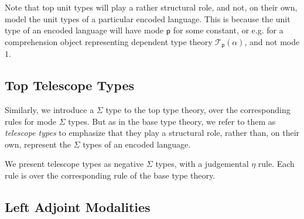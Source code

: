 \documentclass[10pt]{article}
\theoremstyle{definition}
\newcommand\dsd[1]{\ensuremath{\mathsf{#1}}}
\newcommand{\yields}{\vdash}
\newcommand{\TYPE}{\,\,\mathsf{Type}}
\newcommand{\ISFIB}{\,\,\mathsf{IsFib}}
\newcommand{\app}[2]{\ensuremath{#1 \: #2}}
\newcommand{\telety}[3]{\ensuremath{(#1{:}#2,#3)}}
\newcommand{\sigmacl}[3]{\ensuremath{(#1{:}#2,#3)}}
\newcommand{\fst}[1]{\app{\dsd{fst}}{#1}}
\newcommand{\snd}[1]{\app{\dsd{snd}}{#1}}
\newcommand\El[2]{\mathcal{T}_{#1}(#2)}
\begin{document}
Note that top unit types will play a rather structural role, and not, on
their own, model the unit types of a particular encoded language.  This
is because the unit type of an encoded language will have mode
$\mathsf{p}$ for some constant, or e.g. for a comprehension object
representing dependent type theory $\El{\mathsf p}{\alpha}$, and not
mode $1$.  

\subsection{Top Telescope Types}

Similarly, we introduce a $\Sigma$ type to the top type theory, over the
corresponding rules for mode $\Sigma$ types.  But as in the base type
theory, we refer to them as \emph{telescope types} to emphasize that
they play a structural role, rather than, on their own, represent the
$\Sigma$ types of an encoded language.  


We present telescope types as negative $\Sigma$ types, with a
judgemental $\eta$ rule.  Each rule is over the corresponding rule of
the base type theory.

\subsection{Left Adjoint Modalities}
\end{document}
